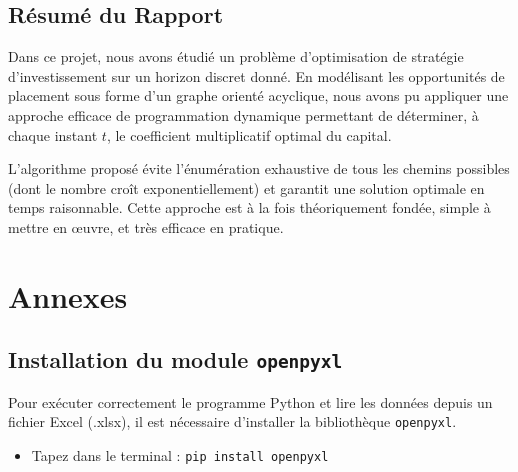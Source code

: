 \documentclass[a4paper,11pt]{article}
\begin{document}
\subsection*{Résumé du Rapport}

Dans ce projet, nous avons étudié un problème d’optimisation de stratégie d’investissement sur un horizon discret donné.  
En modélisant les opportunités de placement sous forme d’un graphe orienté acyclique, nous avons pu appliquer une approche efficace de programmation dynamique permettant de déterminer, à chaque instant $t$, le coefficient multiplicatif optimal du capital.

L’algorithme proposé évite l’énumération exhaustive de tous les chemins possibles (dont le nombre croît exponentiellement) et garantit une solution optimale en temps raisonnable.  
Cette approche est à la fois théoriquement fondée, simple à mettre en œuvre, et très efficace en pratique.


\section*{Annexes}

\subsection*{Installation du module \texttt{openpyxl}}

Pour exécuter correctement le programme Python et lire les données depuis un fichier Excel (.xlsx), il est nécessaire d’installer la bibliothèque \texttt{openpyxl}.

\begin{itemize}
	\item Tapez dans le terminal : \texttt{pip install openpyxl}
\end{itemize}
\end{document}
